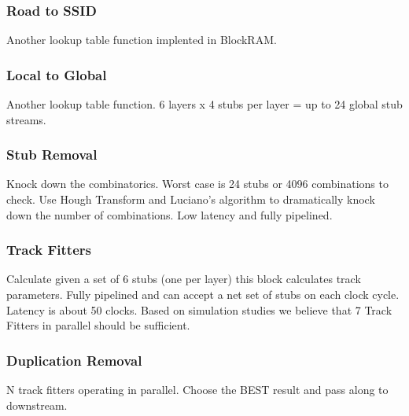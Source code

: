 \documentclass[letterpaper]{article}
\begin{document}
\subsubsection{Road to SSID}

Another lookup table function implented in BlockRAM.

\subsubsection{Local to Global}

Another lookup table function.  6 layers x 4 stubs per layer = up to 24 global stub streams.

\subsubsection{Stub Removal}

Knock down the combinatorics.  Worst case is 24 stubs or 4096 combinations to check.  Use Hough Transform and Luciano's algorithm to dramatically knock down the number of combinations.  Low latency and fully pipelined.

\subsubsection{Track Fitters}

Calculate given a set of 6 stubs (one per layer) this block calculates track parameters.  Fully pipelined and can accept a net set of stubs on each clock cycle.  Latency is about 50 clocks.  Based on simulation studies we believe that 7 Track Fitters in parallel should be sufficient.

\subsubsection{Duplication Removal}

N track fitters operating in parallel.  Choose the BEST result and pass along to downstream.
\end{document}
